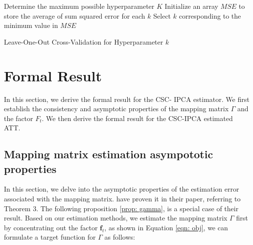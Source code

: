 \documentclass[12pt]{article}
\begin{document}
\begin{algorithm}[!ht]
    \SetAlgoLined
    Determine the maximum possible hyperparameter $K$\;
    Initialize an array $MSE$ to store the average of sum squared error for each $k$\;
      Select $k$ corresponding to the minimum value in $MSE$\;
    \caption{Leave-One-Out Cross-Validation for Hyperparameter $k$}
    \label{algorithm: 2}
\end{algorithm}

\section{Formal Result}
\label{sec: formal result}
In this section, we derive the formal result for the CSC-
IPCA estimator. We first establish the consistency and asymptotic properties of the mapping matrix $\Gamma$ and the factor $F_t$. We then derive the formal result for the CSC-IPCA estimated ATT. 

\subsection{Mapping matrix estimation asympototic properties}
In this section, we delve into the asymptotic properties of the estimation error associated with the mapping matrix. \cite{kelly2020instrumented} have proven it in their paper, referring to Theorem 3. The following proposition \ref{prop: gamma}, is a special case of their result. Based on our estimation methods, we estimate the mapping matrix $\Gamma$ first by concentrating out the factor $\mathbf{f}_t$, as shown in Equation \ref{eqn: obj}, we can formulate a target function for $\Gamma$ as follows:
\end{document}

